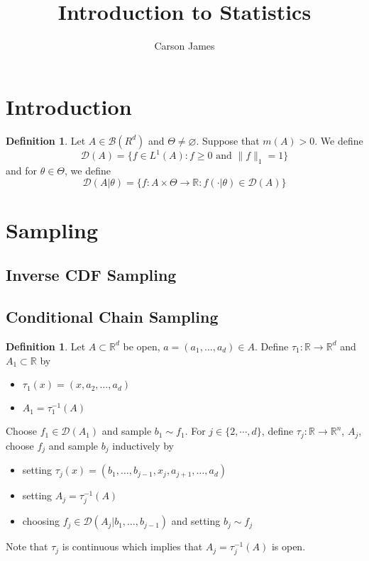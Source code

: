 \documentclass[12pt]{amsart}
\theoremstyle{definition}
\newtheorem{defn}[definition]{Definition}
\newcommand{\R}{\mathbb{R}}
\newcommand{\MB}{\mathcal{B}}
\newcommand{\MD}{\mathcal{D}}
\begin{document}
	
	\title{Introduction to Statistics}
	\author{Carson James}
	\maketitle
	
	\tableofcontents
	
	\section{Introduction}
	\begin{defn}
		Let $A \in \MB(R^d)$ and $\Theta \neq \varnothing$. Suppose that $m(A) > 0$. We define 
		$$\MD(A) = \{f \in L^1(A) : f \geq 0 \text{ and } \|f\|_1 = 1\}$$ 
		and for $\theta \in \Theta$, we define
		$$\MD(A|\theta) = \{f: A \times \Theta \rightarrow \R : f(\cdot| \theta) \in \MD(A)\}$$
	\end{defn}
	
	
	
	
	
	
	\newpage
	\section{Sampling}
	
	\subsection{Inverse CDF Sampling}
	
	
	








		
	\subsection{Conditional Chain Sampling}
	\begin{defn}
	Let $A \subset \R^d$ be open, $a = (a_1, \dots, a_d) \in A$. Define $\tau_1:\R \rightarrow \R^d$ and $A_1 \subset \R$ by 
	\begin{itemize}
	\item $\tau_1(x) = (x, a_2, \ldots, a_d)$
	\item $A_1 = \tau_1^{-1}(A)$
\end{itemize}	 
	Choose $f_1 \in \MD(A_1)$ and sample $b_1 \sim f_1$. For $j \in \{2, \cdots, d\}$, define $\tau_j: \R \rightarrow \R^n$, $A_j$, choose $f_j$ and sample $b_j$ inductively by 
	\begin{itemize}
	\item setting $\tau_j(x) = (b_1, \dots, b_{j-1}, x_j, a_{j+1}, \dots, a_d)$  
	\item setting $A_j = \tau_j^{-1}(A)$
	\item choosing $f_j \in \MD(A_j|b_1, \ldots, b_{j-1})$
	and
	setting $b_j \sim f_j$ 
	\end{itemize}
	Note that $\tau_j$ is continuous which implies that $A_j = \tau_j^{-1}(A)$ is open.
	
	\end{defn}	
	
\end{document}
